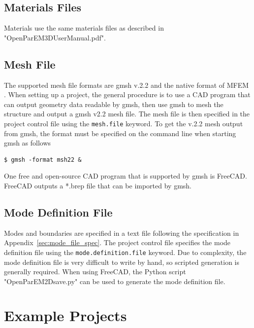 \documentclass[titlepage]{article}
\renewcommand\_{\textunderscore\linebreak[1]}
\begin{document}
\subsection{Materials Files}

Materials use the same materials files as described in "OpenParEM3D\_User\_Manual.pdf".

\subsection{Mesh File}

The supported mesh file formats are gmsh v.2.2 and the native format of MFEM \cite{MFEM}\cite{MFEMweb}.  When setting up a project, the general procedure is to use a CAD program that can output geometry data readable by gmsh, then use gmsh to mesh the structure and output a gmsh v2.2 mesh file.  The mesh file is then specified in the project control file using the \texttt{mesh.file} keyword.  To get the v.2.2 mesh output from gmsh, the format must be specified on the command line when starting gmsh as follows
\begin{Verbatim}[fontsize=\small]
   $ gmsh -format msh22 &
\end{Verbatim}
\noindent One free and open-source CAD program that is supported by gmsh is FreeCAD.  FreeCAD outputs a *.brep file that can be imported by gmsh.

\subsection{Mode Definition File}
\label{sec:mode_definition_file}

Modes and boundaries are specified in a text file following the specification in Appendix~\ref{sec:mode_file_spec}.  The project control file specifies the mode definition file using the \texttt{mode.definition.file} keyword. Due to complexity, the mode definition file is very difficult to write by hand, so scripted generation is generally required.  When using FreeCAD, the Python script "OpenParEM2D\_save.py" can be used to generate the mode definition file.


\section{Example Projects}
\end{document}

